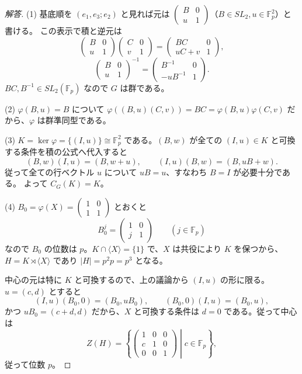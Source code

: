 \begin{proof}[解答]
(1) 基底順を $(e_1,e_3;e_2)$ と見れば元は
$\begin{pmatrix}B&0\\u&1\end{pmatrix}$（$B\in SL_2,u\in\mathbb F_p^2$）と書ける。
この表示で積と逆元は
\[
\begin{pmatrix}B&0\\u&1\end{pmatrix}
\begin{pmatrix}C&0\\v&1\end{pmatrix}
=\begin{pmatrix}BC&0\\uC+v&1\end{pmatrix},
\]
\[
\begin{pmatrix}B&0\\u&1\end{pmatrix}^{-1}
=\begin{pmatrix}B^{-1}&0\\-uB^{-1}&1\end{pmatrix}.
\]
$BC,B^{-1}\in SL_2(\mathbb F_p)$ なので $G$ は群である。

(2) $\varphi(B,u)=B$ について $\varphi((B,u)(C,v))=BC=\varphi(B,u)\varphi(C,v)$ だから、$\varphi$ は群準同型である。

(3) $K=\ker\varphi=\{(I,u)\}\cong\mathbb F_p^2$ である。$(B,w)$ が全ての $(I,u)\in K$ と可換する条件を積の公式へ代入すると
\[
(B,w)(I,u)=(B,w+u),\qquad
(I,u)(B,w)=(B,uB+w).
\]
従って全ての行ベクトル $u$ について $uB=u$、すなわち $B=I$ が必要十分である。
よって $C_G(K)=K$。

(4) $B_0=\varphi(X)=\begin{pmatrix}1&0\\1&1\end{pmatrix}$ とおくと
\[
B_0^j=\begin{pmatrix}1&0\\j&1\end{pmatrix}\qquad(j\in\mathbb F_p)
\]
なので $B_0$ の位数は $p$。$K\cap\langle X\rangle=\{1\}$ で、$X$ は共役により
$K$ を保つから、$H=K\rtimes\langle X\rangle$ であり
$|H|=p^2p=p^3$ となる。

中心の元は特に $K$ と可換するので、上の議論から $(I,u)$ の形に限る。
$u=(c,d)$ とすると
\[
(I,u)(B_0,0)=(B_0,uB_0),\qquad
(B_0,0)(I,u)=(B_0,u),
\]
かつ $uB_0=(c+d,d)$ だから、$X$ と可換する条件は $d=0$ である。従って中心は
\[
Z(H)=\left\{\begin{pmatrix}1&0&0\\c&1&0\\0&0&1\end{pmatrix}\middle|c\in\mathbb F_p\right\},
\]
従って位数 $p$。
\end{proof}

